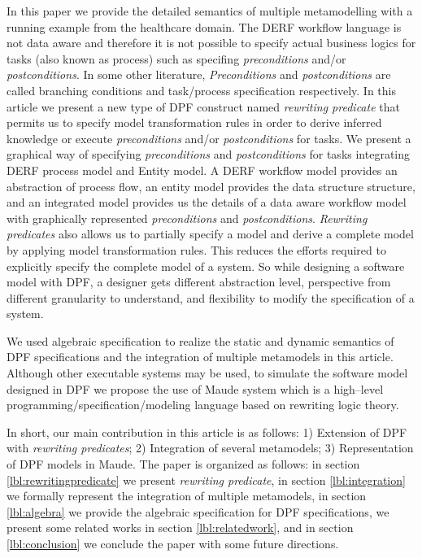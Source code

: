 \documentclass{eceasst}
\begin{document}
In this paper we provide the detailed semantics of multiple metamodelling with a running example from the healthcare domain. 
The DERF workflow language is not data aware and therefore it is not possible to specify actual business logics for tasks (also known as process) 
such as specifing \textit{preconditions} and/or \textit{postconditions}. In some other literature, \textit{Preconditions} and \textit{postconditions} are called branching conditions and 
task/process specification respectively.
In this article we present a new type of DPF construct named \textit{rewriting predicate} that permits us to specify model transformation rules in order to derive inferred knowledge or execute 
\textit{preconditions} and/or \textit{postconditions} for tasks. 
We present a graphical way of specifying \textit{preconditions} and \textit{postconditions} for tasks integrating DERF process model and Entity model. 
A DERF workflow model provides an abstraction of process flow, an entity model provides the data structure structure, and an integrated model provides us the details of a data aware workflow model
with graphically represented \textit{preconditions} and \textit{postconditions}. 
\textit{Rewriting predicates} also allows us to partially specify a model and derive a complete model by applying model transformation rules. 
This reduces the efforts required to explicitly specify the complete model of a system. 
So while designing a software model with DPF, a designer gets different abstraction level, perspective from different granularity to understand, and flexibility to modify the specification of a system. 

We used algebraic specification to realize the static and dynamic semantics of DPF specifications and the integration of multiple metamodels in this article. 
Although other executable systems may be used, to simulate the software model designed in DPF we propose the use of Maude system \cite{Bruni2006,Clavel2007} 
which is a high--level programming/specification/modeling language based on rewriting logic theory. 

In short, our main contribution in this article is as follows: 1) Extension of DPF with \textit{rewriting predicates}; 2) Integration of several metamodels; 3) Representation of DPF models in Maude. 
The paper is organized as follows: in section \ref{lbl:rewritingpredicate} we present \textit{rewriting predicate}, in section \ref{lbl:integration} we formally represent the integration of 
multiple metamodels, in section \ref{lbl:algebra} we provide the algebraic specification for DPF specifications, we present some related works in section \ref{lbl:relatedwork}, and 
in section \ref{lbl:conclusion} we conclude the paper with some future directions. 
\end{document}
